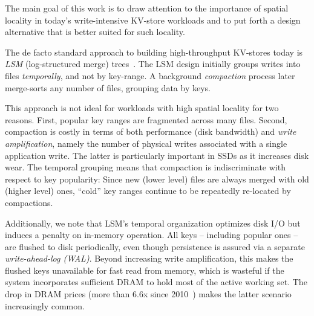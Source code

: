 The main goal of this work is to draw attention to the importance of spatial locality in 
today's write-intensive KV-store workloads and to put forth a design alternative  that is better suited for such locality. 


The de facto standard approach to building high-throughput KV-stores today is \emph{LSM} (log-structured merge) trees~\cite{DBLP:journals/acta/ONeilCGO96}. 
The LSM design initially groups writes  into files \emph{temporally}, and not by key-range. 
A background \emph{compaction} process later merge-sorts any number of files, grouping data by keys. 

This approach is not ideal for workloads with high spatial locality for two reasons. 
First,  popular key ranges are fragmented across many files. 
Second,  compaction  is costly in terms of  both performance 
(disk bandwidth) and \emph{write amplification}, namely the number of physical writes 
associated with a single application write. The latter is  particularly important in SSDs as it increases disk wear. 
The temporal grouping means that compaction is indiscriminate with respect to key popularity:  
Since new (lower level) files are always merged with old (higher level) ones, 
 ``cold'' key ranges  continue to be repeatedly re-located by  compactions.  

Additionally, we note that LSM's temporal  organization optimizes disk I/O but induces a penalty on in-memory operation. 
All keys -- including popular ones -- are flushed to disk periodically, even though persistence is assured via a separate \emph{write-ahead-log (WAL)}.
Beyond increasing write amplification, this makes the flushed keys unavailable for fast read from memory,
which is  wasteful if the system incorporates sufficient DRAM to hold most of the active working set. 
The drop in DRAM prices (more than $6.6$x since 2010~\cite{dram-prices}) makes the latter scenario increasingly common.  

